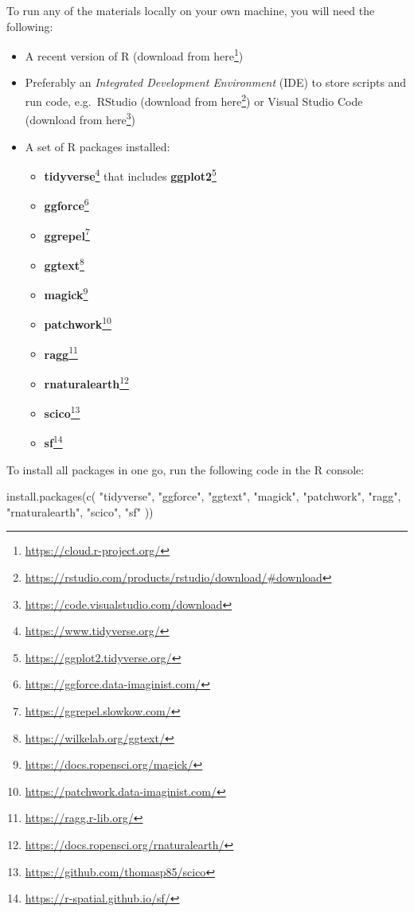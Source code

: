 \documentclass[
]{krantz}
\makeatletter
\newenvironment{Shaded}{\begin{snugshade}}{\end{snugshade}}
\newcommand{\FunctionTok}[1]{\textcolor[rgb]{0,0,0}{#1}}
\newcommand{\NormalTok}[1]{#1}
\newcommand{\StringTok}[1]{\textcolor[rgb]{0.5,0.5,0.5}{#1}}
\providecommand{\tightlist}{%
  \setlength{\itemsep}{0pt}\setlength{\parskip}{0pt}}
\renewcommand{\href}[2]{#2\footnote{\url{#1}}}
\newenvironment{kframe}{%
\medskip{}
\setlength{\fboxsep}{.8em}
 \def\at@end@of@kframe{}%
 \ifinner\ifhmode%
  \def\at@end@of@kframe{\end{minipage}}%
  \begin{minipage}{\columnwidth}%
 \fi\fi%
 \def\FrameCommand##1{\hskip\@totalleftmargin \hskip-\fboxsep
 \colorbox{shadecolor}{##1}\hskip-\fboxsep
     \hskip-\linewidth \hskip-\@totalleftmargin \hskip\columnwidth}%
 \MakeFramed {\advance\hsize-\width
   \@totalleftmargin\z@ \linewidth\hsize
   \@setminipage}}%
 {\par\unskip\endMakeFramed%
 \at@end@of@kframe}
\renewenvironment{Shaded}{\begin{kframe}}{\end{kframe}}
\makeatother
\begin{document}
To run any of the materials locally on your own machine, you will need the following:

\begin{itemize}
\tightlist
\item
  A recent version of R (download from \href{https://cloud.r-project.org/}{here})
\item
  Preferably an \emph{Integrated Development Environment} (IDE) to store scripts and run code, e.g.~RStudio (download from \href{https://rstudio.com/products/rstudio/download/\#download}{here}) or Visual Studio Code (download from \href{https://code.visualstudio.com/download}{here})
\item
  A set of R packages installed:

  \begin{itemize}
  \tightlist
  \item
    \href{https://www.tidyverse.org/}{\textbf{tidyverse}} that includes \href{https://ggplot2.tidyverse.org/}{\textbf{ggplot2}}
  \item
    \href{https://ggforce.data-imaginist.com/}{\textbf{ggforce}}
  \item
    \href{https://ggrepel.slowkow.com/}{\textbf{ggrepel}}
  \item
    \href{https://wilkelab.org/ggtext/}{\textbf{ggtext}}
  \item
    \href{https://docs.ropensci.org/magick/}{\textbf{magick}}
  \item
    \href{https://patchwork.data-imaginist.com/}{\textbf{patchwork}}
  \item
    \href{https://ragg.r-lib.org/}{\textbf{ragg}}
  \item
    \href{https://docs.ropensci.org/rnaturalearth/}{\textbf{rnaturalearth}}
  \item
    \href{https://github.com/thomasp85/scico}{\textbf{scico}}
  \item
    \href{https://r-spatial.github.io/sf/}{\textbf{sf}}
  \end{itemize}
\end{itemize}

To install all packages in one go, run the following code in the R console:

\begin{Shaded}
\begin{Highlighting}[]
\FunctionTok{install.packages}\NormalTok{(}\FunctionTok{c}\NormalTok{(}
  \StringTok{"tidyverse"}\NormalTok{, }\StringTok{"ggforce"}\NormalTok{, }\StringTok{"ggtext"}\NormalTok{, }\StringTok{"magick"}\NormalTok{, }\StringTok{"patchwork"}\NormalTok{, }
  \StringTok{"ragg"}\NormalTok{, }\StringTok{"rnaturalearth"}\NormalTok{, }\StringTok{"scico"}\NormalTok{, }\StringTok{"sf"}
\NormalTok{))}
\end{Highlighting}
\end{Shaded}
\end{document}
